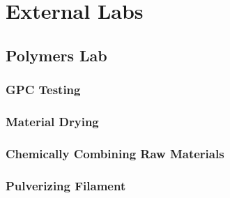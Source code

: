 \newpage
\section{External Labs\label{methedology:externalLabs}}


\subsection{Polymers Lab\label{sec:methedology:externalLabs:polymersLab}}

\subsubsection{GPC Testing\label{sec:methedology:externalLabs:polymersLab:gpcTesting}}

\subsubsection{Material Drying\label{sec:methedology:externalLabs:polymersLab:materialDrying}}

\subsubsection{Chemically Combining Raw Materials\label{sec:methedology:externalLabs:polymersLab:chemicallyCombining}}

\subsubsection{Pulverizing Filament\label{sec:methedology:externalLabs:polymersLab:pulverizingFilament}}

